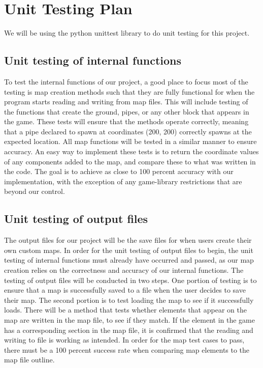 \documentclass[12pt, titlepage]{article}
\begin{document}
\section{Unit Testing Plan}
	We will be using the python unittest library to do unit testing for this project.
\subsection{Unit testing of internal functions}
	To test the internal functions of our project, a good place to focus most of the testing is map creation methods such that they are fully functional for when the program starts reading and writing from map files. This will include testing of the functions that create the ground, pipes, or any other block that appears in the game. These tests will ensure that the methods operate correctly, meaning that a pipe declared to spawn at coordinates (200, 200) correctly spawns at the expected location. All map functions will be tested in a similar manner to ensure accuracy. An easy way to implement these tests is to return the coordinate values of any components added to the map, and compare these to what was written in the code. The goal is to achieve as close to 100 percent accuracy with our implementation, with the exception of any game-library restrictions that are beyond our control.
	
\subsection{Unit testing of output files}		
    The output files for our project will be the save files for when users create their own custom maps. In order for the unit testing of output files to begin, the unit testing of internal functions must already have occurred and passed, as our map creation relies on the correctness and accuracy of our internal functions. The testing of output files will be conducted in two steps. One portion of testing is to ensure that a map is successfully saved to a file when the user decides to save their map. The second portion is to test loading the map to see if it successfully loads. There will be a method that tests whether elements that appear on the map are written in the map file, to see if they match. If the element in the game has a corresponding section in the map file, it is confirmed that the reading and writing to file is working as intended. In order for the map test cases to pass, there must be a 100 percent success rate when comparing map elements to the map file outline.

\end{document}
